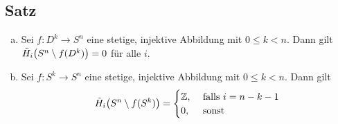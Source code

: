 \subsection{Satz} %
\label{sub:1010}
\begin{enumerate}[a)]
	\item Sei $f \colon D^k \to S^n$ eine stetige, injektive Abbildung mit $0 \le k < n$. Dann gilt $\tilde{H}_i\enbrace[\big]{S^n \setminus f(D^k)} =0$ für alle $i$.
	\item Sei $f \colon S^k \to S^n$ eine stetige, injektive Abbildung mit $0 \le k < n$. Dann gilt 
	\[
		\tilde{H}_i \enbrace[\big]{S^n \setminus f(S^k)} = \begin{cases}
			\mathds{Z}, &\text{ falls }i=n-k-1\\
			0, &\text{ sonst}
		\end{cases}
	\]
\end{enumerate}
